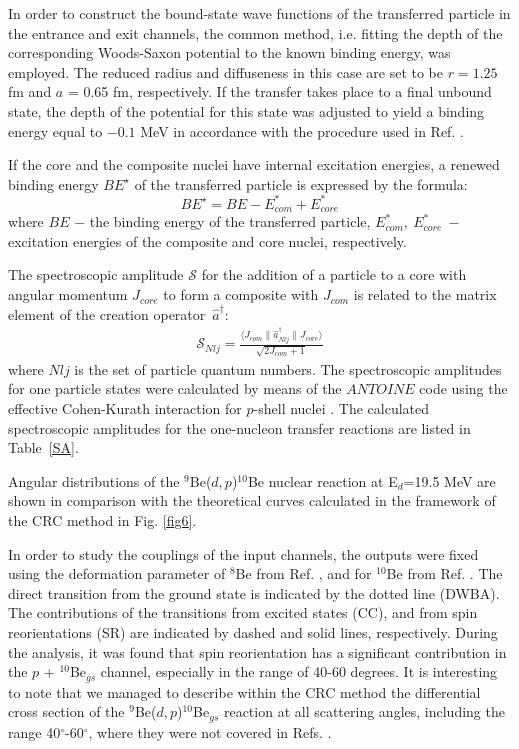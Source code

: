 \documentclass[
12pt, %
oneside, %
english, %
onehalfspacing, %
headsepline, %
]{MastersDoctoralThesis} %
\begin{document}
In order to construct the bound-state wave functions of the transferred particle in the entrance and exit channels, the common method, i.e. fitting the depth of the corresponding Woods-Saxon potential to the known binding energy, was employed. The reduced radius and diffuseness in this case are set to be $r = 1.25$ fm and $a$ = 0.65 fm, respectively. If the transfer takes place to a final unbound state, the depth of the potential for this state was adjusted to yield a binding energy equal to $-0.1$ MeV in accordance with the procedure used in Ref. \cite{harakeh1980}.

If the core and the composite nuclei have internal excitation energies, a renewed binding energy $BE^{\star}$ of the transferred particle is expressed by the formula:
\begin{equation} BE^{\star}=BE - E_{com}^*+E_{core}^* \end{equation}
where $BE$ $-$ the binding energy of the transferred particle, $E_{com}^*,~E_{core}^*~-$  excitation energies of the composite and  core nuclei, respectively.

The spectroscopic amplitude  $\mathcal{S}$ for the addition of a particle to a core with angular momentum $J_{core}$ to form a composite with $J_{com}$ is related to the matrix element of the creation operator~$\hat{a}^\dagger$:
\begin{eqnarray}\label{eq:SA}
\mathcal{S}_{Nlj} = \frac{\langle J_{com} \| \hat{a}^\dagger _{Nlj} \| J_{core}  \rangle}{\sqrt{2J_{com}+1}}
\end{eqnarray}
where $Nlj$ is the set of particle quantum numbers. The spectroscopic amplitudes for one particle states were calculated by means of the $ANTOINE$ code \cite{antoine}  using the effective Cohen-Kurath interaction for $p$-shell nuclei \cite{cohen1965}. The calculated spectroscopic amplitudes for the one-nucleon transfer reactions are listed in Table~\ref{SA}.



Angular distributions of the ${}^9$Be($d,p$)${}^{10}$Be nuclear reaction at E$_d$=19.5 MeV are shown in comparison with the theoretical curves  calculated in the framework of the CRC method in Fig. \ref{fig6}.

In order to study the couplings of the input  channels, the outputs  were fixed using the deformation parameter of $^8$Be from Ref. \cite{rocca2018}, and for $^{10}$Be from Ref. \cite{harakeh1980}. 
The direct transition from the ground state is indicated by the dotted line (DWBA). 
The contributions of the transitions from excited states (CC), and from spin reorientations (SR) are indicated by dashed and solid lines, respectively.
During the analysis, it was found that spin reorientation has a significant contribution in the $p$ + $^{10}$Be$_{gs}$ channel, especially in the range of 40-60 degrees. 
It is interesting to note that we managed to describe within the CRC method the differential cross section of the ${}^9$Be($d,p$)${}^{10}$Be$_{gs}$ reaction at all scattering angles, including the range 40$^\circ$-60$^\circ$, where they were not covered in Refs. \cite{galanina2012, bodek1989}.
 
\end{document}
